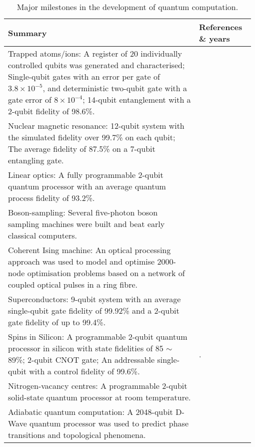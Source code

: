 \begin{table*}[!htbp]
	\begin{tabular}{|p{0.755\linewidth}|p{0.22\linewidth}|}
		\hline
		Summary & References \& years \\
		\hline \hline
		Trapped atoms/ions: A register of 20 individually controlled qubits was generated and characterised; Single-qubit gates with an error per gate of $3.8 \times {10^{ - 5}}$, and deterministic two-qubit gate with a gate error of $8 \times {10^{ - 4}}$; 14-qubit entanglement with a 2-qubit fidelity of 98.6\%. & \cite{bib:friis2018observation, bib:Gaebler2016, bib:monz2011} \\
		\hline
		Nuclear magnetic resonance: 12-qubit system with the simulated fidelity over 99.7\% on each qubit; The average fidelity of 87.5\% on a 7-qubit entangling gate. & \cite{bib:Negrevergne2006, bib:lu2017enhancing, bib:Lu2015} \\
		\hline
		Linear optics: A fully programmable 2-qubit quantum processor with an average quantum process fidelity of 93.2\%. & \cite{bib:qiang2018large} \\
		\hline
		Boson-sampling: Several five-photon boson sampling machines were built and beat early classical computers. & \cite{bib:zhong201812, bib:wang2018toward, bib:wang2017high} \\
		\hline
		Coherent Ising machine: An optical processing approach was used to model and optimise 2000-node optimisation problems based on a network of coupled optical pulses in a ring fibre. & \cite{bib:mcmahon2016fully, bib:inagaki2016coherent} \\
		\hline
		Superconductors: 9-qubit system with an average single-qubit gate fidelity of 99.92\% and a 2-qubit gate fidelity of up to 99.4\%. & \cite{bib:kelly2015state, bib:barends2014superconducting} \\
		\hline
		Spins in Silicon: A programmable 2-qubit quantum processor in silicon with state fidelities of 85 $\sim$ 89\%; 2-qubit CNOT gate; An addressable single-qubit with a control fidelity of 99.6\%. & \cite{bib:watson2018programmable, bib:veldhorst2015two, bib:veldhorst2014addressable}. \\
		\hline
		Nitrogen-vacancy centres: A programmable 2-qubit solid-state quantum processor at room temperature. & \cite{bib:wu2018programmable} \\
		\hline
		Adiabatic quantum computation: A 2048-qubit D-Wave quantum processor was used to predict phase transitions and topological phenomena. & \cite{bib:harris2018phase, bib:king2018observation} \\
		\hline
	\end{tabular}
	\captionspacetab \caption{Major milestones in the development of quantum computation.} \label{tab:quantumcomputer}
\end{table*}

\startalgtable